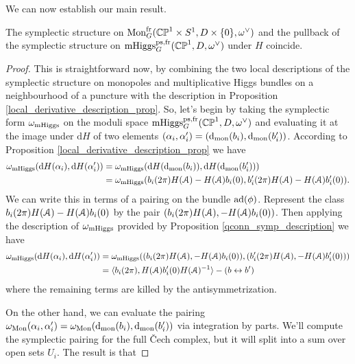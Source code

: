 \documentclass[10pt, oneside]{article}
\DeclareMathOperator{\mhiggs}{mHiggs}
\DeclareMathOperator{\mon}{Mon}
\renewcommand{\d}{\mathrm{d}}
\newcommand{\fr}{\mathrm{fr}}
\renewcommand{\ad}{\mr{ad}}
\begin{document}
We can now establish our main result.
\begin{theorem}
The symplectic structure on $\mon_G^\fr(\bb{CP}^1 \times S^1,D \times\{0\},\omega^\vee)$ and the pullback of the symplectic structure on $\mhiggs_G^{\text{ps,fr}}(\bb{CP}^1,D,\omega^\vee)$ under $H$ coincide.
\end{theorem}

\begin{proof}
This is straightforward now, by combining the two local descriptions of the symplectic structure on monopoles and multiplicative Higgs bundles on a neighbourhood of a puncture with the description in Proposition \ref{local_derivative_description_prop}.  So, let's begin by taking the symplectic form $\omega_{\mathrm{mHiggs}}$ on the moduli space $\mhiggs_G^{\text{ps,fr}}(\bb{CP}^1,D,\omega^\vee)$ and evaluating it at the image under $\d H$ of two elements $(\alpha_i, \alpha'_i) = (\d_{\mr{mon}}(b_i), \d_{\mr{mon}}(b_i'))$.  According to Proposition \ref{local_derivative_description_prop} we have
\begin{align*}
\omega_{\mr{mHiggs}}(\d H(\alpha_i), \d H(\alpha_i')) &= \omega_{\mr{mHiggs}}(\d H(\d_{\mr{mon}}(b_i)), \d H(\d_{\mr{mon}}(b_i'))) \\
&= \omega_{\mr{mHiggs}}(b_i(2\pi)H(\mc A) - H(\mc A)b_i(0),b'_i(2\pi)H(\mc A) - H(\mc A)b'_i(0)).
\end{align*}
We can write this in terms of a pairing on the bundle $\ad(\phi)$.  Represent the class $b_i(2\pi)H(\mathcal{A}) - H(\mathcal{A})b_i(0)$ by the pair $(b_i(2\pi)H(\mathcal{A}), -H(\mathcal{A})b_i(0))$.  Then applying the description of $\omega_{\mathrm{mHiggs}}$ provided by Proposition \ref{qconn_symp_description} we have
\begin{align*}
\omega_{\mr{mHiggs}}(\d H(\alpha_i), \d H(\alpha_i')) &= \omega_{\mr{mHiggs}}((b_i(2\pi)H(\mc A), -H(\mc A)b_i(0)),(b'_i(2\pi)H(\mc A), -H(\mc A)b'_i(0))) \\ 
&= \langle  b_i(2\pi) , H(\mc A) b_i'(0) H(\mc A)^{-1}\rangle - (b \leftrightarrow b')
\end{align*}
where the remaining terms are killed by the antisymmetrization.

On the other hand, we can evaluate the pairing $\omega_{\mr{Mon}}(\alpha_i,\alpha'_i) = \omega_{\mr{Mon}}(\d_{\mr{mon}}(b_i),\d_{\mr{mon}}(b_i'))$ via integration by parts. We'll compute the symplectic pairing for the full \v Cech complex, but it will split into a sum over open sets $U_i$.  The result is that 


\end{proof}
\end{document}
